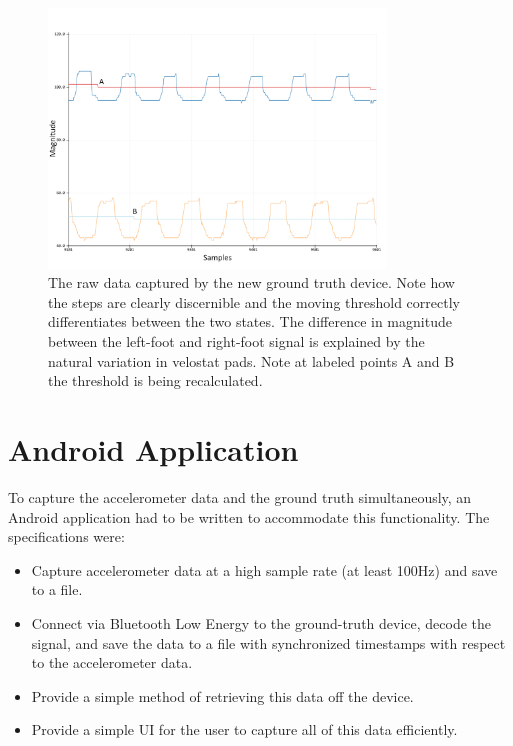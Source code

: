             \begin{figure}[!th]
                \includegraphics[width=0.8\textwidth]{Images/device_new_graph.jpg}
                \centering
                \caption{The raw data captured by the new ground truth device. Note how the steps are clearly discernible and the moving threshold correctly differentiates between the two states. The difference in magnitude between the left-foot and right-foot signal is explained by the natural variation in velostat pads. Note at labeled points A and B the threshold is being recalculated.}
                \label{img_device_new_graph}
            \end{figure}         


        \section{Android Application}

            To capture the accelerometer data and the ground truth simultaneously, an Android application had to be written to accommodate this functionality. The specifications were:

            \begin{itemize}
                \item Capture accelerometer data at a high sample rate (at least 100Hz) and save to a file.
                \item Connect via Bluetooth Low Energy to the ground-truth device, decode the signal, and save the data to a file with synchronized timestamps with respect to the accelerometer data.
                \item Provide a simple method of retrieving this data off the device.
                \item Provide a simple UI for the user to capture all of this data efficiently.
            \end{itemize}

